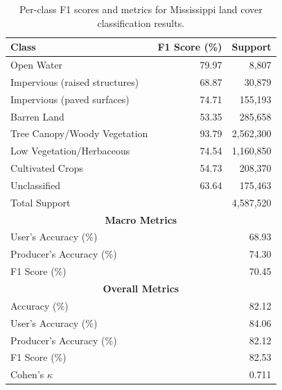 \begin{table}[H]
    \centering
    \caption{Per-class F1 scores and metrics for Mississippi land cover classification results.}\label{tab:classification_report}
    \vspace{0.25cm}
        \begin{tabular}{lrr}
            \toprule
            \textbf{Class} & \textbf{F1 Score (\%)} & \textbf{Support} \\
            \midrule
            Open Water & 79.97 & 8,807 \\
            Impervious (raised structures) & 68.87 & 30,879 \\
            Impervious (paved surfaces) & 74.71 & 155,193 \\
            Barren Land & 53.35 & 285,658 \\
            Tree Canopy/Woody Vegetation & 93.79 & 2,562,300 \\
            Low Vegetation/Herbaceous & 74.54 & 1,160,850 \\
            Cultivated Crops & 54.73 & 208,370 \\
            Unclassified & 63.64 & 175,463 \\
            \midrule
            Total Support & & 4,587,520 \\
            \midrule
            \multicolumn{3}{c}{\textbf{Macro Metrics}} \\
            User's Accuracy (\%) & & 68.93 \\
            Producer's Accuracy (\%) & & 74.30 \\
            F1 Score (\%) & & 70.45 \\
            \midrule
            \multicolumn{3}{c}{\textbf{Overall Metrics}} \\
            Accuracy (\%) & & 82.12 \\
            User's Accuracy (\%) & & 84.06 \\
            Producer's Accuracy (\%) & & 82.12 \\
            F1 Score (\%) & & 82.53 \\
            Cohen's \(\kappa\) & & 0.711 \\
            \bottomrule
        \end{tabular}
\end{table}